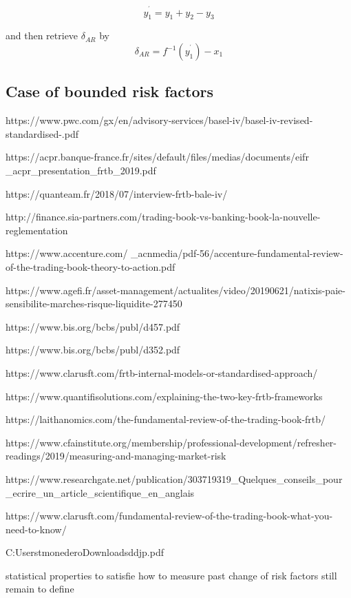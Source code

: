 \documentclass[3pt]{article}
\begin{document}
\begin{equation*}
y_{1}^{^{\prime }}=y_{1}+y_{2}-y_{3}
\end{equation*}

and then retrieve $\delta _{AR}$ by%
\begin{equation*}
\delta _{AR}=f^{-1}\left( y_{1}^{^{\prime }}\right) -x_{1}
\end{equation*}

\subsection{Case of bounded risk factors}

\bigskip

\bigskip

\bigskip

\bigskip

\bigskip
https://www.pwc.com/gx/en/advisory-services/basel-iv/basel-iv-revised-standardised-.pdf

https://acpr.banque-france.fr/sites/default/files/medias/documents/eifr%
\_acpr\_presentation\_frtb\_2019.pdf

https://quanteam.fr/2018/07/interview-frtb-bale-iv/

http://finance.sia-partners.com/trading-book-vs-banking-book-la-nouvelle-reglementation

https://www.accenture.com/%
\_acnmedia/pdf-56/accenture-fundamental-review-of-the-trading-book-theory-to-action.pdf

https://www.agefi.fr/asset-management/actualites/video/20190621/natixis-paie-sensibilite-marches-risque-liquidite-277450

https://www.bis.org/bcbs/publ/d457.pdf

https://www.bis.org/bcbs/publ/d352.pdf

https://www.clarusft.com/frtb-internal-models-or-standardised-approach/

https://www.quantifisolutions.com/explaining-the-two-key-frtb-frameworks

https://laithanomics.com/the-fundamental-review-of-the-trading-book-frtb/

https://www.cfainstitute.org/membership/professional-development/refresher-readings/2019/measuring-and-managing-market-risk

https://www.researchgate.net/publication/303719319\_Quelques\_conseils\_pour%
\_ecrire\_un\_article\_scientifique\_en\_anglais

https://www.clarusft.com/fundamental-review-of-the-trading-book-what-you-need-to-know/

C:\TEXTsymbol{\backslash}Users\TEXTsymbol{\backslash}tmonedero\TEXTsymbol{%
\backslash}Downloads\TEXTsymbol{\backslash}ddjp.pdf

\bigskip 

statistical properties to satisfie how to measure past change of risk
factors still remain to define
\end{document}
